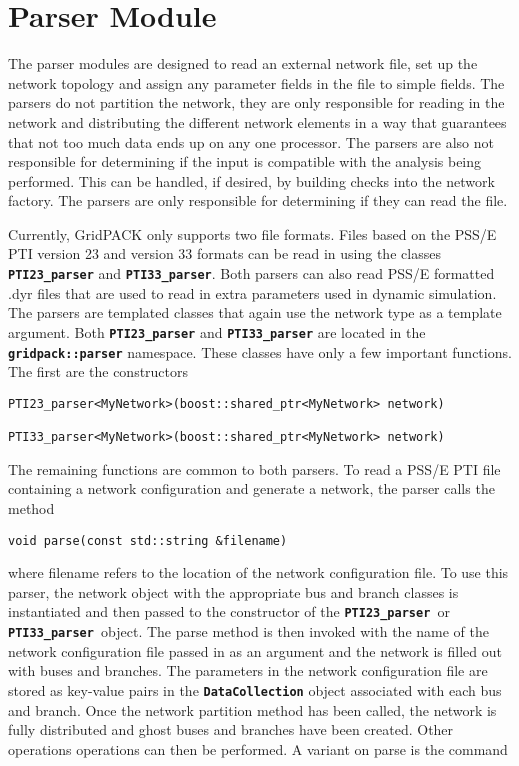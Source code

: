 \section{Parser Module}\label{parsers}

The parser modules are designed to read an external network file, set up the network topology and assign any parameter fields in the file to simple fields. The parsers do not partition the network, they are only responsible for reading in the network and distributing the different network elements in a way that guarantees that not too much data ends up on any one processor. The parsers are also not responsible for determining if the input is compatible with the analysis being performed. This can be handled, if desired, by building checks into the network factory. The parsers are only responsible for determining if they can read the file.

Currently, GridPACK only supports two file formats. Files based on the PSS/E PTI version 23 and version 33 formats can be read in using the classes \texttt{\textbf{PTI23\_parser}} and \texttt{\textbf{PTI33\_parser}}. Both parsers can also read PSS/E formatted .dyr files that are used to read in extra parameters used in dynamic simulation. The parsers are templated classes that again use the network type as a template argument. Both \texttt{\textbf{PTI23\_parser}} and \texttt{\textbf{PTI33\_parser}} are located in the \texttt{\textbf{gridpack::parser}} namespace. These classes have only a few important functions. The first are the constructors

{
\color{red}
\begin{Verbatim}[fontseries=b]
PTI23_parser<MyNetwork>(boost::shared_ptr<MyNetwork> network)

PTI33_parser<MyNetwork>(boost::shared_ptr<MyNetwork> network)
\end{Verbatim}
}

The remaining functions are common to both parsers. To read a PSS/E PTI file containing a network configuration and generate a network, the parser calls the method

{
\color{red}
\begin{Verbatim}[fontseries=b]
void parse(const std::string &filename)
\end{Verbatim}
}

where filename refers to the location of the network configuration file. To use this parser, the network object with the appropriate bus and branch classes is instantiated and then passed to the constructor of the \texttt{\textbf{PTI23\_parser }}or\texttt{\textbf{ PTI33\_parser }}object. The parse method is then invoked with the name of the network configuration file passed in as an argument and the network is filled out with buses and branches. The parameters in the network configuration file are stored as key-value pairs in the \texttt{\textbf{DataCollection}} object associated with each bus and branch. Once the network partition method has been called, the network is fully distributed and ghost buses and branches have been created. Other operations operations can then be performed. A variant on parse is the command

